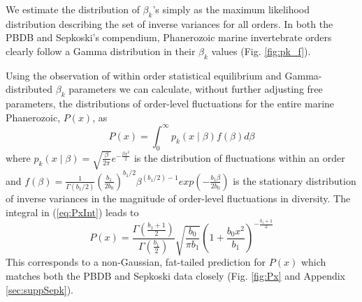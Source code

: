 \documentclass[12pt]{article}
\begin{document}
We estimate the distribution of $\beta_k$'s simply as the maximum
likelihood distribution describing the set of inverse variances for
all orders. In both the PBDB and Sepkoski's compendium, Phanerozoic
marine invertebrate orders clearly follow a Gamma distribution in
their $\beta_k$ values (Fig. \ref{fig:pk_f}).  

Using the observation of within order statistical equilibrium and
Gamma-distributed $\beta_k$ parameters we can calculate, without
further adjusting free parameters, the distributions of order-level
fluctuations for the entire marine Phanerozoic, $P(x)$, as
\begin{equation}
  P(x) = \int_0^\infty p_k(x \mid \beta) f(\beta) d\beta \label{eq:PxInt}
\end{equation}
where
$p_k(x \mid \beta) = \sqrt{\frac{\beta}{2\pi}} e^{-\frac{\beta
    x^2}{2}}$ is the distribution of fluctuations within an order and
$f(\beta) = \frac{1}{\Gamma(b_1/2)}
\left(\frac{b_1}{2b_0}\right)^{b_1/2} \beta^{(b_1/2) - 1}
exp\left(-\frac{b_1 \beta}{2 b_0}\right)$ is the stationary
distribution of inverse variances in the magnitude of order-level
fluctuations in diversity. The integral in (\ref{eq:PxInt}) leads to
\begin{equation}
  P(x) = \frac{\Gamma\left(\frac{b_1 +
        1}{2}\right)}{\Gamma\left(\frac{b_1}{2}\right)}
  \sqrt{\frac{b_0}{\pi b_1}} \left(1 + \frac{b_0
      x^2}{b_1}\right)^{-\frac{b_1 + 1}{2}}
\end{equation}
This corresponds to a non-Gaussian, fat-tailed prediction for
$P(x)$ which matches both the PBDB and Sepkoski data closely
(Fig. \ref{fig:Px} and Appendix \ref{sec:suppSepk}).
\end{document}
